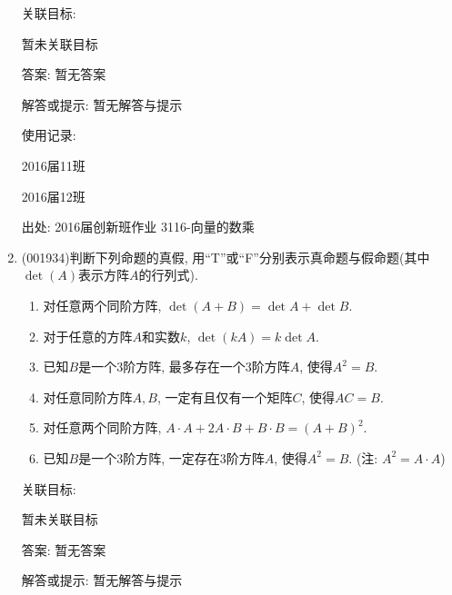 \documentclass[10pt,a4paper]{article}
\newcommand{\blank}[1]{\underline{\hbox to #1pt{}}}
\begin{document}
\begin{enumerate}[1.]
关联目标:

暂未关联目标

答案: 暂无答案

解答或提示: 暂无解答与提示

使用记录:

2016届11班								

2016届12班								


出处: 2016届创新班作业	3116-向量的数乘
\item { (001934)}判断下列命题的真假, 用``T''或``F''分别表示真命题与假命题(其中$\det(A)$表示方阵$A$的行列式).\\ 
\begin{enumerate}[\blank{30}1.]
\item 对任意两个同阶方阵, $\det(A+B)=\det A+\det B$.\\ 
\item 对于任意的方阵$A$和实数$k$, $\det (kA)=k\det A$.\\ 
\item 已知$B$是一个$3$阶方阵, 最多存在一个$3$阶方阵$A$, 使得$A^2=B$.\\ 
\item 对任意同阶方阵$A,B$, 一定有且仅有一个矩阵$C$, 使得$AC=B$.\\ 
\item 对任意两个同阶方阵, $A\cdot A+2A\cdot B+B\cdot B=(A+B)^2$.\\ 
\item 已知$B$是一个$3$阶方阵, 一定存在$3$阶方阵$A$, 使得$A^2=B$. (注: $A^2=A\cdot A$)\\ 
\end{enumerate}


关联目标:

暂未关联目标

答案: 暂无答案

解答或提示: 暂无解答与提示


\end{enumerate}
\end{document}

